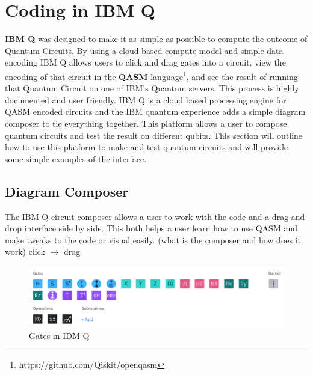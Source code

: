 \documentclass{article}
\newcommand{\qasm}{\footnote{https://github.com/Qiskit/openqasm}}
\begin{document}
    
    
    
\section{Coding in IBM Q}
    \textbf{IBM Q} was designed to make it as simple as possible to compute the outcome of Quantum Circuits. By using a cloud based compute model and simple data encoding IBM Q allows users to click and drag gates into a circuit, view the encoding of that circuit in the \textbf{QASM} language\qasm, and see the result of running that Quantum Circuit on one of IBM's Quantum servers. This process is highly documented and user friendly. IBM Q is a cloud based processing engine for QASM encoded circuits and the IBM quantum experience adds a simple diagram composer to tie everything together. This platform allows a user to compose quantum circuits and test the result on different qubits. This section will outline how to use this platform to make and test quantum circuits and will provide some simple examples of the interface.
    \subsection{Diagram Composer}
        The IBM Q circuit composer allows a user to work with the code and a drag and drop interface side by side. This both helps a user learn how to use QASM and make tweaks to the code or visual easily. 
        (what is the composer and how does it work) click $\rightarrow$ drag
        \begin{figure}
            \centering
            \includegraphics[width=\linewidth]{Circuits/gates.png}
            \caption{Gates in IDM Q}
        \end{figure}
\end{document}

